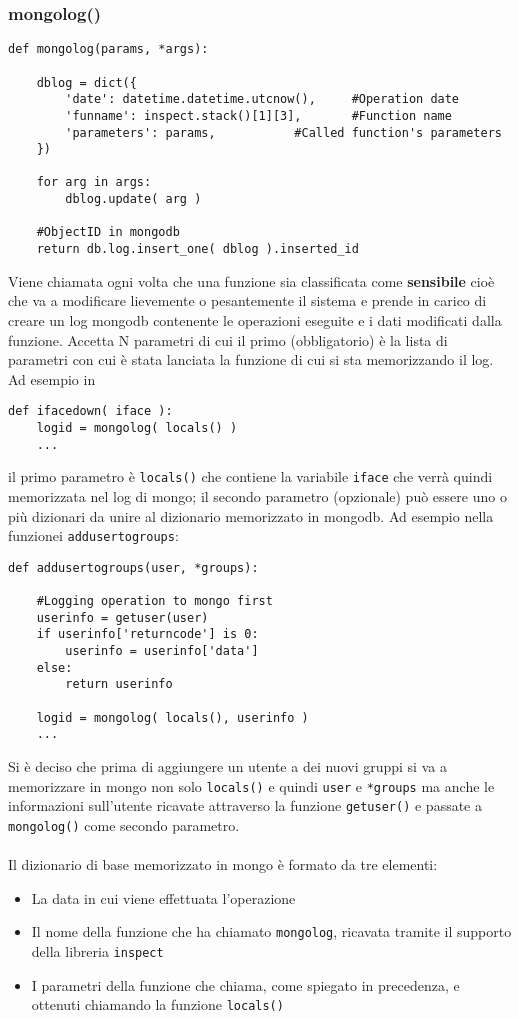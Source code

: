 \documentclass[11pt]{article}
\begin{document}
\subsubsection{mongolog()}\label{mongolog}
\begin{lstlisting}
def mongolog(params, *args):

    dblog = dict({
    	'date': datetime.datetime.utcnow(),     #Operation date
    	'funname': inspect.stack()[1][3],       #Function name
    	'parameters': params,			#Called function's parameters
    })
    
    for arg in args:
        dblog.update( arg )

    #ObjectID in mongodb
    return db.log.insert_one( dblog ).inserted_id
\end{lstlisting}
Viene chiamata ogni volta che una funzione sia classificata come \textbf{sensibile} cioè che va a modificare lievemente o pesantemente il sistema
e prende in carico di creare un log mongodb contenente le operazioni eseguite e i dati modificati dalla funzione.
Accetta N parametri di cui il primo (obbligatorio) è la lista di parametri con cui è stata lanciata la funzione
di cui si sta memorizzando il log. Ad esempio in
\begin{lstlisting}
def ifacedown( iface ):
	logid = mongolog( locals() )
	...
\end{lstlisting}
il primo parametro è \texttt{locals()} che contiene la variabile \texttt{iface} che verrà quindi memorizzata nel log di mongo;
il secondo parametro (opzionale) può essere uno o più dizionari da unire al dizionario memorizzato in mongodb.
Ad esempio nella funzionei \texttt{addusertogroups}:
\begin{lstlisting}
def addusertogroups(user, *groups):

    #Logging operation to mongo first
    userinfo = getuser(user)
    if userinfo['returncode'] is 0:
        userinfo = userinfo['data']
    else:
        return userinfo

    logid = mongolog( locals(), userinfo )
    ...
\end{lstlisting}
Si è deciso che prima di aggiungere un utente a dei nuovi gruppi si va a memorizzare in mongo non solo \texttt{locals()} e quindi
\texttt{user} e \texttt{*groups} ma anche le informazioni sull'utente ricavate attraverso la funzione \texttt{getuser()} e passate
a \texttt{mongolog()} come secondo parametro.
\\~\\
Il dizionario di base memorizzato in mongo è formato da tre elementi:
\begin{itemize}
	\item{La data in cui viene effettuata l'operazione}
	\item{Il nome della funzione che ha chiamato \texttt{mongolog}, ricavata tramite il supporto della libreria \texttt{inspect}}
	\item{I parametri della funzione che chiama, come spiegato in precedenza, e ottenuti chiamando la funzione \texttt{locals()}}
\end{itemize}
\end{document}
